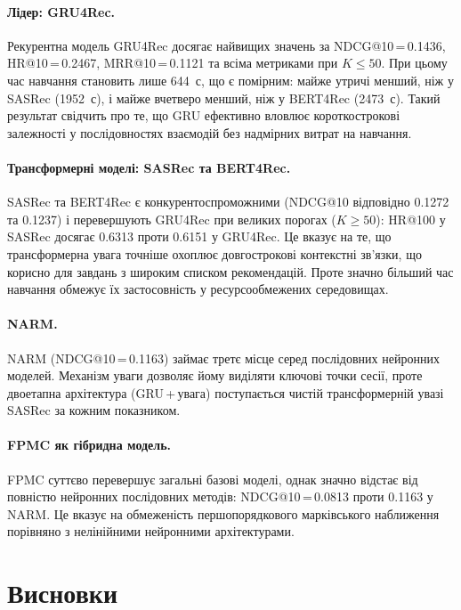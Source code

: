 \documentclass[12pt,a4paper]{article}
\begin{document}
\paragraph{Лідер: GRU4Rec.}
Рекурентна модель GRU4Rec досягає найвищих значень за NDCG@10\,=\,0.1436,
HR@10\,=\,0.2467, MRR@10\,=\,0.1121 та всіма метриками при $K\le 50$.
При цьому час навчання становить лише 644~с, що є помірним: майже утричі
менший, ніж у SASRec (1952~с), і майже вчетверо менший, ніж у BERT4Rec (2473~с).
Такий результат свідчить про те, що GRU ефективно вловлює короткострокові
залежності у послідовностях взаємодій без надмірних витрат на навчання.

\paragraph{Трансформерні моделі: SASRec та BERT4Rec.}
SASRec та BERT4Rec є конкурентоспроможними (NDCG@10 відповідно 0.1272 та
0.1237) і перевершують GRU4Rec при великих порогах ($K\ge 50$): HR@100 у
SASRec досягає 0.6313 проти 0.6151 у GRU4Rec.
Це вказує на те, що трансформерна увага точніше охоплює довгострокові
контекстні зв'язки, що корисно для завдань з широким списком рекомендацій.
Проте значно більший час навчання обмежує їх застосовність у
ресурсообмежених середовищах.

\paragraph{NARM.}
NARM (NDCG@10\,=\,0.1163) займає третє місце серед послідовних нейронних
моделей. Механізм уваги дозволяє йому виділяти ключові точки сесії, проте
двоетапна архітектура (GRU\,+\,увага) поступається чистій трансформерній
увазі SASRec за кожним показником.

\paragraph{FPMC як гібридна модель.}
FPMC суттєво перевершує загальні базові моделі, однак значно відстає від
повністю нейронних послідовних методів: NDCG@10\,=\,0.0813 проти 0.1163
у NARM.
Це вказує на обмеженість першопорядкового марківського наближення порівняно
з нелінійними нейронними архітектурами.

\section{Висновки}
\end{document}
